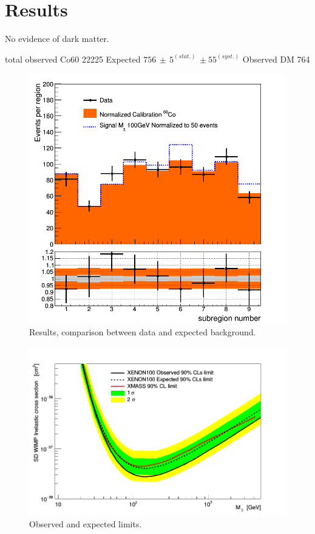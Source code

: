 \section{Results}
No evidence of dark matter.

 total observed Co60 22225
  Expected  $756 \, \pm \, 5^{(stat.)} \, \pm 55^{(syst.)}$
   Observed DM 764


\begin{figure}[h]
  \includegraphics[width=\linewidth]{images/data_vs_bkg.png}
  \caption{Results, comparison between data and expected background.}
  \label{fig:dataVSbkg}
\end{figure}

\begin{figure}[h!]
  \includegraphics[width=\linewidth]{images/limit_reb.png}
  \caption{Observed and expected limits.}
  \label{fig:limits}
\end{figure}


